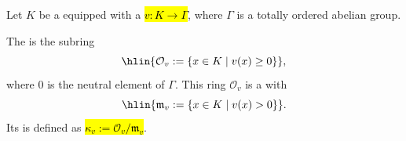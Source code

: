 \begin{definition} \label{definition:valuation_ring_of_a_valued_field}
Let $K$ be a  equipped with a   
\hl{$v : K \to \Gamma$},  
where $\Gamma$ is a totally ordered abelian group.  

The  is the subring  
$$\hlin{\mathcal{O}_v := \{ x \in K \mid v(x) \geq 0 \}},$$  
where $0$ is the neutral element of $\Gamma$.  
This ring $\mathcal{O}_v$ is a  with   
$$\hlin{\mathfrak{m}_v := \{ x \in K \mid v(x) > 0 \}}.$$
Its  is defined as \hl{$\kappa_v := \mathcal{O}_v / \mathfrak{m}_v$}.  
\end{definition}
